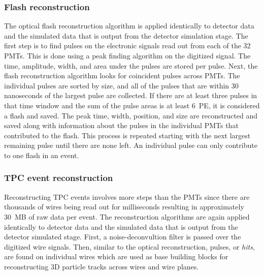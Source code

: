   \subsubsection{Flash reconstruction}\label{sec:flashreco}
    The optical flash reconstruction algorithm is applied identically to
    detector data and the simulated data that is output from the detector
    simulation stage.  The first step is to find pulses on the electronic
    signals read out from each of the 32 PMTs. This is done using a peak
    finding algorithm on the digitized signal. The time, amplitude, width, and
    area under the pulses are stored per pulse. Next, the flash reconstruction
    algorithm looks for coincident pulses across PMTs. The individual pulses
    are sorted by size, and all of the pulses that are within 30 nanoseconds of
    the largest pulse are collected. If there are at least three pulses in that
    time window and the sum of the pulse areas is at least 6~PE, it is considered a
    flash and saved. The peak time, width, position, and size are reconstructed
    and saved along with information about the pulses in the individual PMTs
    that contributed to the flash. This process is repeated starting with the
    next largest remaining pulse until there are none left. An individual pulse
    can only contribute to one flash in an event.

  \subsubsection{TPC event reconstruction}\label{sec:tpcreco}
    Reconstructing TPC events involves more steps than the PMTs since there are
    thousands of wires being read out for milliseconds resulting in
    approximately 30~MB of raw data per event. The reconstruction algorithms
    are again applied identically to detector data and the simulated data that
    is output from the detector simulated stage. First, a noise-deconvultion
    filter is passed over the digitized wire signals. Then, similar to the
    optical reconstruction, pulses, or \textit{hits}, are found on individual
    wires which are used as base building blocks for reconstructing 3D particle
    tracks across wires and wire planes.

